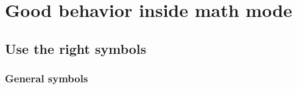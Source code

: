 \chapter{Good behavior inside math mode}





\section{Use the right symbols}





\subsection{General symbols}

